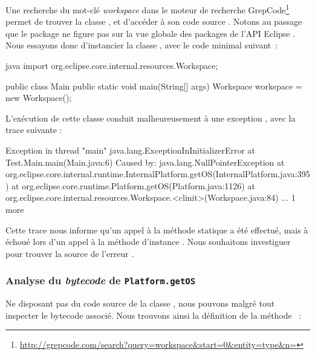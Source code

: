 Une recherche du mot-clé \textit{workspace} dans le moteur de recherche GrepCode\footnote{%
\url{http://grepcode.com/search?query=workspace&start=0&entity=type&n=}} %
permet de trouver la classe , et d'accéder à son code source \cite{eclipseworkspace}.
Notons au passage que le package  ne figure pas sur la vue globale des packages de l'API Eclipse \cite{eclipseapioverview}.
Nous essayons donc d'instancier la classe , avec le code minimal suivant~:

\begin{imtaCode}{java}
import org.eclipse.core.internal.resources.Workspace;    

public class Main {
    public static void main(String[] args) {
        Workspace workspace = new Workspace();
    }
}
\end{imtaCode}

L'exécution de cette classe conduit malheureusement à une exception , avec la trace suivante :

\begin{imtaConsole}
Exception in thread "main" java.lang.ExceptionInInitializerError
	at Test.Main.main(Main.java:6)
Caused by: java.lang.NullPointerException
	at org.eclipse.core.internal.runtime.InternalPlatform.getOS(InternalPlatform.java:395)
	at org.eclipse.core.runtime.Platform.getOS(Platform.java:1126)
	at org.eclipse.core.internal.resources.Workspace.<clinit>(Workspace.java:84)
	... 1 more
\end{imtaConsole}

Cette trace nous informe qu'un appel à la méthode statique  a été effectué, mais à échoué lors d'un appel à la méthode d'instance %
.
Nous souhaitons investiguer pour trouver la source de l'erreur .


\subsubsection{Analyse du \textit{bytecode} de \texttt{Platform.getOS}}

Ne disposant pas du code source de la classe , nous pouvons malgré tout inspecter le bytecode associé.
Nous trouvons ainsi la définition de la méthode ~:


